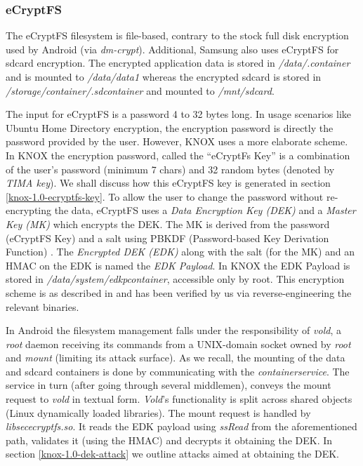 \documentclass[11pt]{article}
\begin{document}
\subsubsection{eCryptFS} \label{knox-1.0-ecryptfs}
The eCryptFS filesystem is file-based, contrary to the stock full disk encryption used by Android (via \emph{dm-crypt}). Additional, Samsung also uses 
eCryptFS for sdcard encryption.
The encrypted application data is stored in \emph{/data/.container} and is mounted to \emph{/data/data1} whereas the encrypted 
sdcard is stored in \emph{/storage/container/.sdcontainer} and mounted to \emph{/mnt/sdcard}. 

The input for eCryptFS is a password 4 to 32 bytes long. In usage scenarios like Ubuntu Home Directory encryption, 
the encryption password is directly the password provided by the user.
However, KNOX uses a more elaborate scheme. In KNOX the encryption password, called the ``eCryptFs Key''  is a combination of the user's password 
(minimum 7 chars) and 32 random bytes (denoted by \emph{TIMA key}). 
We shall discuss how this eCryptFS key is generated in section \ref{knox-1.0-ecryptfs-key}.
To allow the user to change the password without re-encrypting the data, eCryptFS uses a \emph{Data Encryption Key (DEK)} and a \emph{Master Key (MK)} 
which encrypts the DEK. The MK is derived from the password (eCryptFS Key) and a salt using PBKDF (Password-based Key Derivation Function) \cite{PBKDF}. 
The \emph{Encrypted DEK (EDK)} along with the salt (for the MK) and an HMAC on the EDK is named the \emph{EDK Payload}. 
In KNOX the EDK Payload is stored in \emph{/data/system/edk\textunderscore p\textunderscore container}, accessible only by root.
This encryption scheme is as described in \cite{SamsungKeyManagement} and has been verified by us via reverse-engineering the relevant binaries.

In Android the filesystem management falls under the responsibility of \emph{vold}, a \emph{root} daemon receiving its commands from a 
UNIX-domain socket owned by \emph{root} and \emph{mount} (limiting its attack surface).
As we recall, the mounting of the data and sdcard containers is done by communicating with the \emph{container\textunderscore service}. 
The service in turn (after going through several middlemen), conveys the mount request to \emph{vold} in textual form.
\emph{Vold}'s functionality is split across shared objects (Linux dynamically loaded libraries). 
The mount request is handled by \emph{libsec\textunderscore ecryptfs.so}. It reads the EDK payload using \emph{ssRead} from the aforementioned path, 
validates it (using the HMAC) and decrypts it obtaining the DEK. In section \ref{knox-1.0-dek-attack} we outline attacks aimed at obtaining the DEK.
\end{document}
